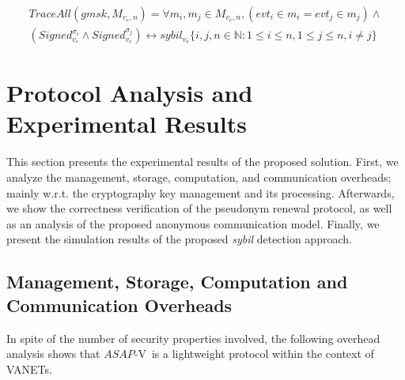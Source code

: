 \documentclass[preprint,12pt]{elsarticle}
\newcommand{\protocolname}{$ASAP$-V}
\begin{document}

\begin{equation}
\label{eq:traceall}
\begin{split}
TraceAll(gmsk, M_{v_{e}, n}) = \forall m_{i}, m_{j} \in M_{v_{e},n}, (evt_{i} \in m_{i} = evt_{j} \in m_{j}) \wedge \\
(Signed^{\sigma_{i}}_{v_{e}} \wedge Signed^{\sigma_{j}}_{v_{e}}) \leftrightarrow sybil_{v_{e}} \{i, j, n \in \mathbb{N} : 1 \le i \le n, 1 \le j \le n, i \neq j\}
\end{split}
\end{equation}

\section{Protocol Analysis and Experimental Results}
\label{sec:results}

This section presents the experimental results of the proposed solution. First, we analyze the management, storage, computation, and communication overheads; mainly w.r.t. the cryptography key management and its processing. Afterwards, we show the correctness verification of the pseudonym renewal protocol, as well as an analysis of the proposed anonymous communication model. Finally, we present the simulation results of the proposed \textit{sybil} detection approach.

\subsection{Management, Storage, Computation and Communication Overheads}
\label{sec:overheads}
In spite of the number of security properties involved, the following overhead analysis shows that \protocolname~is a lightweight protocol within the context of VANETs.
\end{document}
